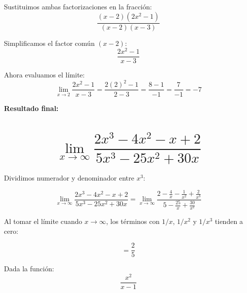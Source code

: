 \documentclass[addpoints,spanish, 12pt,a4paper]{exam}
\begin{document}
\begin{questions}
\begin{parts}
\begin{solution}
    Sustituimos ambas factorizaciones en la fracción:
    \[
    \frac{(x - 2)(2x^2 - 1)}{(x - 2)(x - 3)}
    \]

    Simplificamos el factor común \( (x - 2) \):
    \[
    \frac{2x^2 - 1}{x - 3}
    \]

    Ahora evaluamos el límite:
    \[
    \lim_{x \to 2} \frac{2x^2 - 1}{x - 3} = \frac{2(2)^2 - 1}{2 - 3} = \frac{8 - 1}{-1} = \frac{7}{-1} = -7
    \]

    \textbf{Resultado final:} 
    \end{solution}

    \part[1] {$$\lim_{x \to \infty} \dfrac{2x^3 - 4x^2 - x + 2}{5x^3 - 25x^2 + 30x}$$}

    \begin{solution}
    Dividimos numerador y denominador entre $x^3$:
    
    \[
    \lim_{x \to \infty} \frac{2x^3 - 4x^2 - x + 2}{5x^3 - 25x^2 + 30x}
    = \lim_{x \to \infty} \frac{2 - \frac{4}{x} - \frac{1}{x^2} + \frac{2}{x^3}}{5 - \frac{25}{x} + \frac{30}{x^2}}
    \]
    
    Al tomar el límite cuando $x \to \infty$, los términos con $1/x$, $1/x^2$ y $1/x^3$ tienden a cero:
    
    \[
    = \frac{2}{5}
    \]
    \end{solution}
\end{parts}



  \question  Dada la función: $$\dfrac{x^2}{x-1}$$ 
\end{questions}
\end{document}
